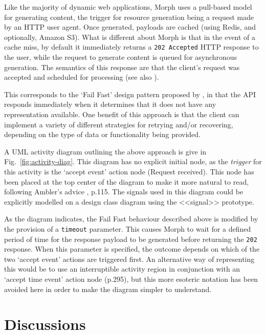 \documentclass[runningheads,a4paper]{llncs}
\begin{document}
Like the majority of dynamic web applications, Morph uses a pull-based model for generating content, the trigger for resource generation being a request made by an HTTP user agent. Once generated, payloads are cached (using Redis, and optionally, Amazon S3). What is different about Morph is that in the event of a cache miss, by default it immediately returns a \texttt{202 Accepted} HTTP response \cite{ietf} to the user, while the request to generate content is queued for asynchronous generation. The semantics of this response are that the client's request was accepted and scheduled for processing (see also \cite{webcaching}).

This corresponds to the `Fail Fast' design pattern proposed by \cite{nygard}, in that the API responds immediately when it determines that it does not have any representation available. One benefit of this approach is that the client can implement a variety of different strategies for retrying and/or recovering, depending on the type of data or functionality being provided.

A UML activity diagram outlining the above approach is give in Fig.~\ref{fig:activity-diag}. This diagram has no explicit initial node, as the \textit{trigger} for this activity is the `accept event' action node (\textsf{Request received}). This node has been placed at the top center of the diagram to make it more natural to read, following Ambler's advice \cite{ambler}, p.115. The signals used in this diagram could be explicitly modelled on a design class diagram using the \textsf{<<signal>>} prototype.

As the diagram indicates, the Fail Fast behaviour described above is modified by the provision of a \texttt{timeout} parameter. This causes Morph to wait for a defined period of time for the response payload to be generated before returning the \texttt{202} response. When this parameter is specified, the outcome depends on which of the two `accept event' actions are triggered first. An alternative way of representing this would be to use an interruptible activity region in conjunction with an `accept time event' action node \cite{arlow} (p.295), but this more esoteric notation has been avoided here in order to make the diagram simpler to understand.


\section{Discussions}

\end{document}
